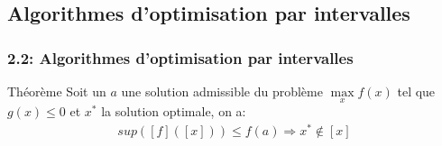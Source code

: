 \documentclass{beamer}
\begin{document}
\subsection{Algorithmes d'optimisation par intervalles}

\begin{frame}
    \frametitle{2.2: Algorithmes d'optimisation par intervalles}
    \begin{block}{Théorème}
        Soit un $a$ une solution admissible du problème $\max\limits_{x} f(x)$ tel que $g(x) \leq 0$ et $x^*$ la solution optimale, on a:
        \begin{align}
            sup([f]([x])) \leq f(a) \Rightarrow x^* \notin [x]
        \end{align}
    \end{block}




\end{frame}
\end{document}
